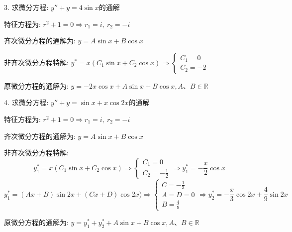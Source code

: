 
3. 求微分方程: $y''+y=4\sin x$的通解
\begin{solution}
	
	特征方程为: $r^2+1=0\Rightarrow r_{1}=i,\ r_{2}=-i$
	
	齐次微分方程的通解为: $y=A\sin x+B\cos x$
	
	非齐次微分方程特解: $y^{*}=x(C_{1}\sin x+C_{2}\cos x)\Rightarrow \left\lbrace 
	\begin{array}{l}
		C_{1}=0\\
		C_{2}=-2
	\end{array}
	\right. $
	
	原微分方程的通解为: $y=-2x\cos x+A\sin x+B\cos x,A\text{、}B\in \mathbb{R}$
\end{solution}


4.  求微分方程: $y''+y=\sin x+x\cos 2x$的通解
\begin{solution}
	
	特征方程为: $r^2+1=0\Rightarrow r_{1}=i,\ r_{2}=-i$
	
	齐次微分方程的通解为: $y=A\sin x+B\cos x$
	
	非齐次微分方程特解: 
	$$y_{1}^{*}=x(C_{1}\sin x+C_{2}\cos x)\Rightarrow \left\lbrace 
	\begin{array}{l}
		C_{1}=0\\
		C_{2}=-\frac{1}{2}
	\end{array}
	\right. \Rightarrow y_{1}^{*}=-\frac{x}{2}\cos x$$
	$$y_{1}^{*}=(Ax+B)\sin 2x+(Cx+D)\cos 2x)\Rightarrow \left\lbrace 
	\begin{array}{l}
		C=-\frac{1}{3}\\
		A=D=0\\
		B=\frac{4}{9}
	\end{array}
	\right.\Rightarrow y_{2}^{*}=-\frac{x}{3}\cos 2x+\frac{4}{9}\sin 2x $$
	
	原微分方程的通解为: $y=y_{1}^{*}+y_{2}^{*}+A\sin x+B\cos x,A\text{、}B\in \mathbb{R}$
\end{solution}


